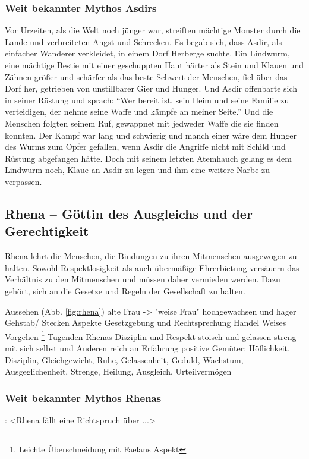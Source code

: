 \subsubsection{Weit bekannter Mythos Asdirs}
Vor Urzeiten, als die Welt noch jünger war, streiften mächtige Monster durch die Lande und verbreiteten Angst und Schrecken. 
Es begab sich, dass Asdir, als einfacher Wanderer verkleidet, in einem Dorf Herberge suchte. 
Ein Lindwurm, eine mächtige Bestie mit einer geschuppten Haut härter als Stein und Klauen und Zähnen größer und schärfer als das beste Schwert der Menschen, fiel über das Dorf her, getrieben von unstillbarer Gier und Hunger. 
Und Asdir offenbarte sich in seiner Rüstung und sprach: 
``Wer bereit ist, sein Heim und seine Familie zu verteidigen, der nehme seine Waffe und kämpfe an meiner Seite.'' 
Und die Menschen folgten seinem Ruf, gewappnet mit jedweder Waffe die sie finden konnten. 
Der Kampf war lang und schwierig und manch einer wäre dem Hunger des Wurms zum Opfer gefallen, wenn Asdir die Angriffe nicht mit Schild und Rüstung abgefangen hätte. 
Doch mit seinem letzten Atemhauch gelang es dem Lindwurm noch, Klaue an Asdir zu legen und ihm eine weitere Narbe zu verpassen.





\subsection{Rhena -- Göttin des Ausgleichs und der Gerechtigkeit}
Rhena lehrt die Menschen, die Bindungen zu ihren Mitmenschen ausgewogen zu halten. 
Sowohl Respektlosigkeit als auch übermäßige Ehrerbietung versäuern das Verhältnis zu den Mitmenschen und müssen daher vermieden werden. 
Dazu gehört, sich an die Gesetze und Regeln der Gesellschaft zu halten.
\begin{outline}
	\1 Aussehen (Abb. \ref{fig:rhena})
		\2 alte Frau  -> "weise Frau"
		\2 hochgewachsen und hager
		\2 Gehstab/ Stecken
	\1 Aspekte
		\2 Gesetzgebung und Rechtsprechung
		\2 Handel
		\2 Weises Vorgehen \footnote{Leichte Überschneidung mit Faelans Aspekt}
	\1 Tugenden Rhenas
		\2 Disziplin und Respekt
		\2 stoisch und gelassen
		\2 streng mit sich selbst und Anderen
		\2 reich an Erfahrung
	\1 positive Gemüter: Höflichkeit, Disziplin, Gleichgewicht, Ruhe, Gelassenheit, Geduld, Wachstum, Ausgeglichenheit, Strenge, Heilung, Ausgleich, Urteilvermögen
\end{outline}

\subsubsection{Weit bekannter Mythos Rhenas}:
<Rhena fällt eine Richtspruch über ...>






